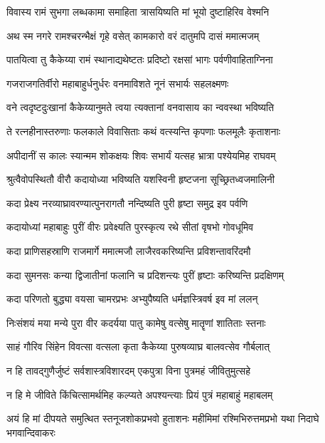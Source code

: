 \twolineshloka
{विवास्य रामं सुभगा लब्धकामा समाहिता}
{त्रासयिष्यति मां भूयो दुष्टाहिरिव वेश्मनि} %

\twolineshloka
{अथ स्म नगरे रामश्चरन्भैक्षं गृहे वसेत्}
{कामकारो वरं दातुमपि दासं ममात्मजम्} %

\twolineshloka
{पातयित्वा तु कैकेय्या रामं स्थानाद्यथेष्टतः}
{प्रदिष्टो रक्षसां भागः पर्वणीवाहिताग्निना} %

\twolineshloka
{गजराजगतिर्वीरो महाबाहुर्धनुर्धरः}
{वनमाविशते नूनं सभार्यः सहलक्ष्मणः} %

\twolineshloka
{वने त्वदृष्टदुःखानां कैकेय्यानुमते त्वया}
{त्यक्तानां वनवासाय का न्ववस्था भविष्यति} %

\twolineshloka
{ते रत्नहीनास्तरुणाः फलकाले विवासिताः}
{कथं वत्स्यन्ति कृपणाः फलमूलैः कृताशनाः} %

\twolineshloka
{अपीदानीं स कालः स्यान्मम शोकक्षयः शिवः}
{सभार्यं यत्सह भ्रात्रा पश्येयमिह राघवम्} %

\twolineshloka
{श्रुत्वैवोपस्थितौ वीरौ कदायोध्या भविष्यति}
{यशस्विनी हृष्टजना सूच्छ्रितध्वजमालिनी} %

\twolineshloka
{कदा प्रेक्ष्य नरव्याघ्रावरण्यात्पुनरागतौ}
{नन्दिष्यति पुरी हृष्टा समुद्र इव पर्वणि} %

\twolineshloka
{कदायोध्यां महाबाहुः पुरीं वीरः प्रवेक्ष्यति}
{पुरस्कृत्य रथे सीतां वृषभो गोवधूमिव} %

\twolineshloka
{कदा प्राणिसहस्राणि राजमार्गे ममात्मजौ}
{लाजैरवकरिष्यन्ति प्रविशन्तावरिंदमौ} %

\twolineshloka
{कदा सुमनसः कन्या द्विजातीनां फलानि च}
{प्रदिशन्त्यः पुरीं हृष्टाः करिष्यन्ति प्रदक्षिणम्} %

\twolineshloka
{कदा परिणतो बुद्ध्या वयसा चामरप्रभः}
{अभ्युपैष्यति धर्मज्ञस्त्रिवर्ष इव मां ललन्} %

\twolineshloka
{निःसंशयं मया मन्ये पुरा वीर कदर्यया}
{पातु कामेषु वत्सेषु मातॄणां शातिताः स्तनाः} %

\twolineshloka
{साहं गौरिव सिंहेन विवत्सा वत्सला कृता}
{कैकेय्या पुरुषव्याघ्र बालवत्सेव गौर्बलात्} %

\twolineshloka
{न हि तावद्गुणैर्जुष्टं सर्वशास्त्रविशारदम्}
{एकपुत्रा विना पुत्रमहं जीवितुमुत्सहे} %

\twolineshloka
{न हि मे जीविते किंचित्सामर्थमिह कल्प्यते}
{अपश्यन्त्याः प्रियं पुत्रं महाबाहुं महाबलम्} %

\fourlineindentedshloka
{अयं हि मां दीपयते समुत्थित}
{स्तनूजशोकप्रभवो हुताशनः}
{महीमिमां रश्मिभिरुत्तमप्रभो}
{ यथा निदाघे भगवान्दिवाकरः} %


